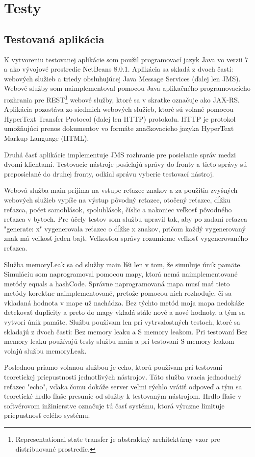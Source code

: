 \documentclass[12pt,oneside,final]{fithesis-utf8}
\begin{document}
\chapter{Testy}

\section{Testovaná aplikácia}
K vytvoreniu testovanej aplikácie som použil programovací jazyk Java vo verzii 7 a ako vývojové prostredie NetBeans 8.0.1. Aplikácia sa skladá z dvoch častí: webových služieb a triedy obsluhujúcej Java Message Services (ďalej len JMS). Webové služby som naimplementoval pomocou Java aplikačného programovacieho rozhrania pre REST\footnote{Representational state transfer je abstraktný architektúrny vzor pre distribuované prostredie.} webové služby, ktoré sa v skratke označuje ako JAX-RS. Aplikácia pozostáva zo siedmich webových služieb, ktoré sú volané pomocou HyperText Transfer Protocol (ďalej len HTTP) protokolu. HTTP je protokol umožňujúci prenos dokumentov vo formáte značkovacieho jazyka HyperText Markup Language (HTML).
\par Druhá časť aplikácie implementuje JMS rozhranie pre posielanie správ medzi dvomi klientami. Testovacie nástroje posielajú správy do fronty a tieto správy sú preposielané do druhej fronty, odkiaľ správu vyberie testovací nástroj.
\par Webová služba main prijíma na vstupe reťazec znakov a za použitia zvyšných webových služieb vypíše na výstup pôvodný reťazec, otočený reťazec, dĺžku reťazca, počet samohlások, spoluhlások, číslic a nakoniec veľkosť pôvodného reťazca v bytoch. Pre účely testov som službu upravil tak, aby po zadaní reťazca "{}generate: x" vygenerovala reťazec o dĺžke x znakov, pričom každý vygenerovaný znak má veľkosť jeden bajt. Veľkosťou správy rozumieme veľkosť vygenerovaného reťazca.
\par Služba memoryLeak sa od služby main líši len v tom, že simuluje únik pamäte. Simuláciu som naprogramoval pomocou mapy, ktorá nemá naimplementované metódy equals a hashCode. Správne naprogramovaná mapa musí mať tieto metódy korektne naimplementované, pretože pomocou nich rozhoduje, či sa vkladaná hodnota v mape už nachádza. Bez týchto metód moja mapa nedokáže detekovať duplicity a preto do mapy vkladá stále nové a nové hodnoty, a tým sa vytvorí únik pamäte. Službu používam len pri vytrvalostných testoch, ktoré sa skladajú z dvoch častí: Bez memory leaku a S memory leakom. Pri testovaní Bez memory leaku používajú testy službu main a pri testovaní S memory leakom volajú službu memoryLeak.
\par Poslednou priamo volanou službou je echo, ktorú používam pri testovaní teoretickej priepustnosti jednotlivých nástrojov. Táto služba vracia jednoduchý reťazec "{}echo", vďaka čomu dokáže server veľmi rýchlo vrátiť odpoveď a tým sa teoretické hrdlo fľaše presunie od služby k testovaným nástrojom. Hrdlo fľaše v softvérovom inžinierstve označuje tú časť systému, ktorá výrazne limituje priepustnosť celého systému.
\end{document}

